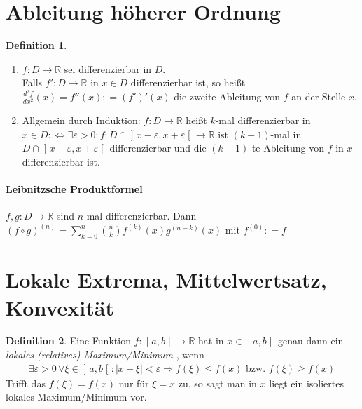 \documentclass[ngerman,titlepage,twoside, parskip=half*]{scrreprt}
\newcommand*{\R}{\mathbb{R}}
\newcommand*{\perdef}{:\Leftrightarrow}
\theoremstyle{plain}
\theoremstyle{definition}
\newtheorem{definition}{Definition}
\theoremstyle{remark}
\newcommand*{\abs}[2][]{#1\lvert#2#1\rvert}
\newcommand*{\coloneqq}{\mathrel{\mathop:}=}
\newcommand*{\bsofint}[1]{\mathopen{]}#1\mathclose{[}} %
\begin{document}
\section{Ableitung höherer Ordnung}
\begin{definition}
  \begin{enumerate}[(1)]
    \item $f\colon D\rightarrow\R$ sei differenzierbar in $D$.\\
      Falls $f'\colon D\rightarrow\R$ in $x\in D$ differenzierbar ist, so
      heißt $\frac{d^2 f}{dx^2}(x)=f''(x)\coloneqq(f')'(x)$ die zweite 
      Ableitung von $f$ an der Stelle $x$.
    \item Allgemein durch Induktion: $f\colon D\rightarrow\R$ heißt $k$-mal
      differenzierbar in $x\in D\perdef \exists \varepsilon>0
      \colon f\colon D\cap \bsofint{x-\varepsilon,x+\varepsilon}\rightarrow\R$ ist $(k-1)$-mal
      in $D\cap\bsofint{x-\varepsilon,x+\varepsilon}$ differenzierbar und die
      $(k-1)$-te Ableitung von $f$ in $x$ differenzierbar ist.
  \end{enumerate}
\end{definition}

\paragraph{Leibnitzsche Produktformel}
$f,g\colon D\rightarrow\R$ sind $n$-mal differenzierbar. Dann $(f\circ g)^{(n)}
=\sum_{k=0}^n \binom{n}{k}f^{(k)}(x)g^{(n-k)}(x)$ mit $f^{(0)}\coloneqq f$

\section{Lokale Extrema, Mittelwertsatz, Konvexität}
\begin{definition}
  Eine Funktion $f\colon\bsofint{a,b}\rightarrow\R$ hat in $x\in \bsofint{a,b}$ genau dann
  ein \emph{lokales (relatives) Maximum/Minimum
  },
  wenn
  \begin{gather*}\exists \varepsilon>0\,\forall\xi\in \bsofint{a,b}\colon\abs{x-\xi}<\varepsilon
  \Rightarrow f(\xi)\leq f(x) \text{ bzw. } f(\xi)\geq f(x)\end{gather*}
  Trifft das $f(\xi)=f(x)$ nur für $\xi=x$ zu, so sagt man in $x$ liegt
  ein isoliertes lokales Maximum/Minimum vor.
\end{definition}
\end{document}
